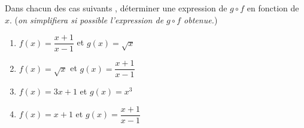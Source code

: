 \begin{exercice}
 Dans chacun des cas suivants , déterminer  une expression de  $ g\circ f $ en fonction de $ x $. (\textit{on simplifiera si possible l'expression de $ g\circ f $ obtenue.})

\begin{enumerate}
\item  $ f(x)= \dfrac{x+1}{x-1} $ \; et \; $ g(x)=\sqrt{x} $


\item $ f(x)= \sqrt{x} $ \;  et \; $ g(x)=\dfrac{x+1}{x-1}$

\item  $ f(x)= 3x+1 $  \;et\; $ g(x)=x^{3} $


\item $ f(x)= x+1 $ \;  et \; $ g(x)=\dfrac{x+1}{x-1}$

\end{enumerate}

\end{exercice}




